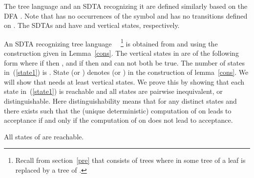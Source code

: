 \documentclass[copyright]{eptcs}
\begin{document}
The tree language  and an SDTA  recognizing it are
defined similarly based on the DFA . Note that  has no
occurrences of the symbol  and  has no transitions defined
on .
The SDTAs  and  have  and 
vertical states, respectively.

An SDTA  recognizing tree language \ \
\footnote{Recall from section~\ref{pre} that 
consists of trees where in some tree of  a leaf is replaced
by a tree of .} is obtained from  and  using the
construction given in Lemma~\ref{cons}. The vertical states in 
are of the following form
 where if  then , and if 
then  and  can not both be true. The number of states
in~(\ref{state1}) is . State  (or
) denotes  (or ) in the construction of
lemma~\ref{cons}. We will show that  needs at least  vertical states. We prove this by showing
that each state in~(\ref{state1}) is reachable and all states are
pairwise inequivalent, or distinguishable. Here distinguishability
means that for any distinct states  and  there exists  such that the (unique deterministic) computation
of  on  leads to acceptance if and only if
the computation of  on  does not lead to
acceptance.

\begin{lemma}
All states of  are reachable.
\label{reach}
\end{lemma}
\end{document}
